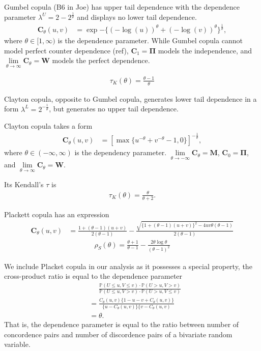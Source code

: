 Gumbel copula (B6 in Joe) has upper tail dependence with the dependence parameter
$\lambda^U = 2-2^{\frac{1}{\theta}}$ and displays no lower tail dependence.
\begin{align}
    \bm{C}_{\theta}(u,v) &= \exp{-\{
    (-\log(u))^\theta +(-\log(v))^\theta
    \}^{\frac{1}{\theta}}},
    \end{align}
where $\theta \in [1,\infty)$ is the dependence parameter.\medskip
While Gumbel copula cannot model perfect counter dependence (ref), $\bm{C}_{1} = \bm{\Pi}$ models the independence,
and $\lim\limits_{\theta \to \infty} \bm{C}_\theta = \bm{W}$ models the perfect dependence.


  \begin{align}
    \tau_K(\theta) =\frac{\theta-1}{\theta}
    \end{align}

Clayton copula, opposite to Gumbel copula,
generates lower tail dependence in a form $\lambda^L = 2^{-\frac{1}{\theta}}$,
but generates no upper tail dependence.\medskip

Clayton copula takes a form
\begin{align}
    \bm{C}_{\theta}(u,v) &= \left[
    \max\{u^{-\theta}+v^{-\theta}-1,0\}\right]^{-\frac{1}{\theta}},
    \end{align}
where $\theta \in (-\infty, \infty)$ is the dependency parameter.
$\lim\limits_{\theta \to -\infty} \bm{C}_\theta = \bm{M}$, $\bm{C}_0 = \bm{\Pi}$, and $\lim\limits_{\theta \to \infty} \bm{C}_\theta = \bm{W}$.\medskip

Its Kendall's $\tau$ is
\begin{align}
    \tau_K(\theta) =\frac{\theta}{\theta+2}.
    \end{align}\medskip

Plackett copula has an expression
\begin{align}
    \bm{C}_{\theta}(u,v) &= \frac{1+(\theta-1)(u+v)}{2(\theta-1)}
                         - \frac{\sqrt{\{
    1+(\theta-1)(u+v)\}^2 - 4uv\theta(\theta-1)}}{2(\theta-1)}
    \end{align}
\begin{align}
    \rho_S(\theta) = \frac{\theta+1}{\theta-1} - \frac{2\theta \log \theta}{(\theta-1)^2}
    \end{align}\medskip

We include Placket copula in our analysis as it possesses a special property,
the cross-product ratio is equal to the dependence parameter
\begin{align}
    &\phantom{=} \frac{\mathbb{P}(U \leq u, V \leq v) \cdot \mathbb{P}(U > u, V > v)}
    {\mathbb{P}(U \leq u, V > v) \cdot \mathbb{P}(U > u, V \leq v)}\\
    &= \frac{C_\theta(u,v)\{1-u-v+C_\theta(u,v)\}}{\{u-C_\theta(u,v)\}\{v-C_\theta(u,v)}\\
    &= \theta.
    \end{align}\medskip
That is, the dependence parameter is equal to the ratio between number of concordence pairs and number of discordence pairs of a bivariate random variable.
